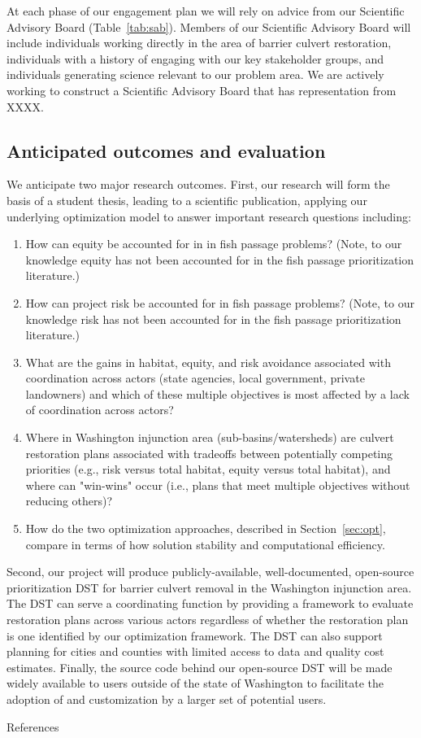 \documentclass[12pt]{elsarticle}
\begin{document}
At each phase of our engagement plan we will rely on advice from our Scientific Advisory Board (Table~\ref{tab:sab}). Members of our Scientific Advisory Board will include individuals working directly in the area of barrier culvert restoration, individuals with a history of engaging with our key stakeholder groups, and individuals generating science relevant to our problem area. We are actively working to construct a Scientific Advisory Board that has representation from XXXX.

\subsection{Anticipated outcomes and evaluation}

We anticipate two major research outcomes. First, our research will form the basis of a student thesis, leading to a scientific publication, applying our underlying optimization model to answer important research questions including:

\begin{enumerate}
\item How can equity be accounted for in in fish passage problems? (Note, to our knowledge equity has not been accounted for in the fish passage prioritization literature.)
\item How can project risk be accounted for in fish passage problems? (Note, to our knowledge risk has not been accounted for in the fish passage prioritization literature.)
\item What are the gains in habitat, equity, and risk avoidance associated with coordination across actors (state agencies, local government, private landowners) and which of these multiple objectives is most affected by a lack of coordination across actors?
\item Where in Washington injunction area (sub-basins/watersheds) are culvert restoration plans associated with tradeoffs between potentially competing priorities (e.g., risk versus total habitat, equity versus total habitat), and where can "win-wins" occur (i.e., plans that meet multiple objectives without reducing others)?
\item How do the two optimization approaches, described in Section~\ref{sec:opt}, compare in terms of how solution stability and computational efficiency.
\end{enumerate}


Second, our project will produce publicly-available, well-documented, open-source prioritization DST for barrier culvert removal in the Washington injunction area. The DST can serve a coordinating function by providing a framework to evaluate restoration plans across various actors regardless of whether the restoration plan is one identified by our optimization framework. The DST can also support planning for cities and counties with limited access to data and quality cost estimates. Finally, the source code behind our open-source DST will be made widely available to users outside of the state of Washington to facilitate the adoption of and customization by a larger set of potential users. 


\clearpage
\large References\\
\normalsize

\end{document}
